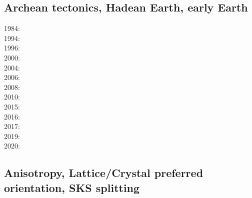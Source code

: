 \subsection{Archean tectonics, Hadean Earth, early Earth}

\noindent
\begin{scriptsize}
1984: \cite{boas84}\\
1994: \cite{vlvv94}\\
1996: \cite{kafo96}\\
2000: \cite{devv00b}\\
2004: \cite{vavv04b}\cite{vavv04}\\
2006: \cite{reho06}\\
2008: \cite{vava08}\\
2010: \cite{grpy10}\\
2015: \cite{maha15}\\
2016: \cite{onlw16}\cite{fige16}\\
2017: \cite{onmz17}\\
2019: \cite{canc19}\cite{gery19}\\
2020: \cite{chcg20}
\end{scriptsize}

\subsection{Anisotropy, Lattice/Crystal preferred orientation, SKS splitting}
\label{sec:topics:anisotropy}

\noindent
{\scriptsize
\cite{zhhj93}
\cite{mudm02}
\cite{mumc03}
\cite{mumc04}\cite{karb04}
\cite{besb06}
\cite{cobs07}\cite{rimb07}
\cite{beke08}\cite{beck08}
\cite{cobe10}\cite{jabi10a}
\cite{obbh11}\cite{scbb11}
\cite{mibe12}
\cite{faca13}\cite{almb13}
\cite{facc14}
\cite{ealw15}
\cite{majf17}
\cite{peka18}
}

